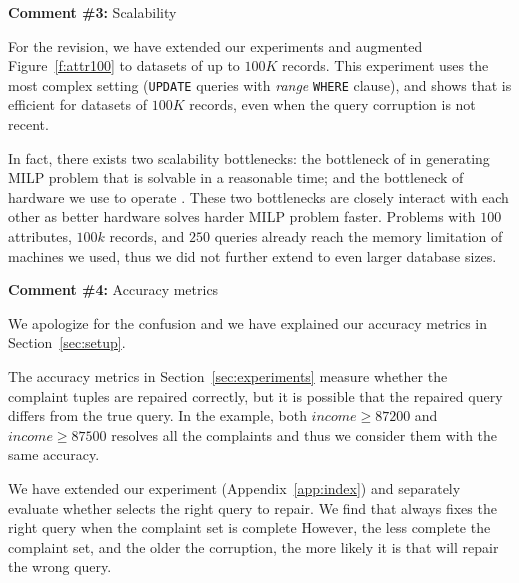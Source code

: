 

\noindent
\textbf{Comment \#3:} Scalability 
\begin{quote}
\end{quote}

For the revision, we have extended our experiments and augmented
Figure~\ref{f:attr100} to datasets of up to $100K$ records. This experiment
uses the most complex setting (\texttt{UPDATE} queries with \textit{range}
\texttt{WHERE} clause), and shows that \sys is efficient for datasets of
$100K$ records, even when the query corruption is not recent.

In fact, there exists two scalability bottlenecks: the bottleneck of \sys in generating MILP problem that is solvable in 
a reasonable time; and the bottleneck of hardware we use to operate \sys. 
These two bottlenecks are closely interact with each other as better hardware solves harder MILP problem faster. 
Problems with $100$ attributes, $100k$ records, and $250$ queries already 
reach the memory limitation of machines we used, thus we did not further extend \sys to even larger database sizes. 



\comskip

\noindent
\textbf{Comment \#4:} Accuracy metrics
\begin{quote}
\end{quote}

We apologize for the confusion and we have explained our accuracy metrics in Section~\ref{sec:setup}.

The accuracy metrics in Section~\ref{sec:experiments} measure whether the complaint tuples 
are repaired correctly, but it is possible that the repaired query differs from the true query. 
In the example, both $income \geq 87200$ and $income \geq 87500$ 
resolves all the complaints and thus we consider them with the same accuracy. 

We have extended our experiment (Appendix~\ref{app:index}) and separately evaluate 
whether \sys selects the right query to repair. 
We find that \sys always fixes the right query when the complaint 
set is complete  However, the less complete the complaint set, and the older 
the corruption, the more likely it is that \sys will repair the wrong query.

